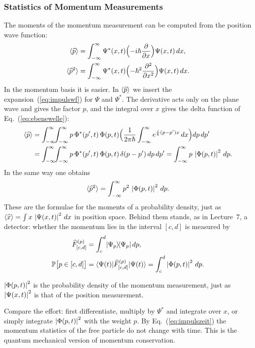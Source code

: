 \subsubsection{Statistics of Momentum Measurements}
The moments of the momentum measurement can be computed from the position wave function:
\begin{equation}\label{eq:pmomenteort}
	\begin{split}
		\langle\widehat{p}\rangle &= \int_{-\infty}^{\infty} \Psi^*(x,t)\Bigl(-i\hbar\frac{\partial}{\partial x}\Bigr)\Psi(x,t)\,dx, \\
		\langle\widehat{p}^2\rangle &= \int_{-\infty}^{\infty} \Psi^*(x,t)\Bigl(-\hbar^2\frac{\partial^2}{\partial x^2}\Bigr)\Psi(x,t)\,dx.
	\end{split}
\end{equation}
In the momentum basis it is easier. In $\langle\widehat{p}\rangle$ we insert the expansion~(\ref{eq:impulswf}) for $\Psi$ and $\Psi^*$. The derivative acts only on the plane wave and gives the factor $p$, and the integral over $x$ gives the delta function of Eq.~(\ref{eq:ebenewelle}):
\begin{equation}
	\begin{split}
		\langle\widehat{p}\rangle &= \int_{-\infty}^{\infty}\!\!\int_{-\infty}^{\infty} p\,\Phi^*(p',t)\,\Phi(p,t)\Bigl(\frac{1}{2\pi\hbar}\int_{-\infty}^{\infty} e^{\frac{i}{\hbar}(p-p')x}\,dx\Bigr)dp\,dp' \\
		&= \int_{-\infty}^{\infty}\!\!\int_{-\infty}^{\infty} p\,\Phi^*(p',t)\,\Phi(p,t)\,\delta(p-p')\,dp\,dp' = \int_{-\infty}^{\infty} p\,\left\lvert \Phi(p,t) \right\rvert^2\,dp.
	\end{split}
\end{equation}
In the same way one obtains
\begin{equation}
	\langle\widehat{p}^2\rangle = \int_{-\infty}^{\infty} p^2\,\left\lvert \Phi(p,t) \right\rvert^2\,dp.
\end{equation}
These are the formulae for the moments of a probability density, just as $\langle\widehat{x}\rangle = \int x\,\left\lvert \Psi(x,t) \right\rvert^2\,dx$ in position space. Behind them stands, as in Lecture~7, a detector: whether the momentum lies in the interval $[c,d]$ is measured by
\begin{equation}
	\begin{split}
		\widehat{F}^{(p)}_{[c,d]} &= \int_c^d \lvert \Psi_p \rangle\!\langle \Psi_p \rvert\,dp, \\
		\mathbb{P}\bigl[p\in[c,d]\bigr] &= \langle \Psi(t) \rvert \widehat{F}^{(p)}_{[c,d]} \lvert \Psi(t) \rangle = \int_c^d \left\lvert \Phi(p,t) \right\rvert^2\,dp.
	\end{split}
\end{equation}
\begin{merksatz}
	$\left\lvert \Phi(p,t) \right\rvert^2$ is the probability density of the momentum measurement, just as $\left\lvert \Psi(x,t) \right\rvert^2$ is that of the position measurement.
\end{merksatz}
Compare the effort: first differentiate, multiply by $\Psi^*$ and integrate over $x$, or simply integrate $\left\lvert \Phi(p,t) \right\rvert^2$ with the weight $p$. By Eq.~(\ref{eq:impulszeit}) the momentum statistics of the free particle do not change with time. This is the quantum mechanical version of momentum conservation.

